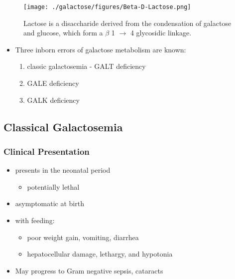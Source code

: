 \documentclass{scrartcl}
\begin{document}
\begin{figure}[htbp]
\centering
\texttt{[image: ./galactose/figures/Beta-D-Lactose.png]}
\caption[lactose]{\label{fig:orgafada4c}
Lactose is a disaccharide derived from the condensation of galactose and glucose, which form a \(\beta\) 1 \(\to\) 4 glycosidic linkage.}
\end{figure}

\begin{itemize}
\item Three inborn errors of galactose metabolism are known:
\begin{enumerate}
\item classic galactosemia - GALT deficiency
\item GALE deficiency
\item GALK deficiency
\end{enumerate}
\end{itemize}

\subsection{Classical Galactosemia}
\label{sec:org51f7943}
\subsubsection{Clinical Presentation}
\label{sec:org1f7dd55}
\begin{itemize}
\item presents in the neonatal period
\begin{itemize}
\item potentially lethal
\end{itemize}
\item asymptomatic at birth
\item with feeding:
\begin{itemize}
\item poor weight gain, vomiting, diarrhea
\item hepatocellular damage, lethargy, and hypotonia
\end{itemize}
\item May progress to Gram negative sepsis, cataracts
\end{itemize}
\end{document}
